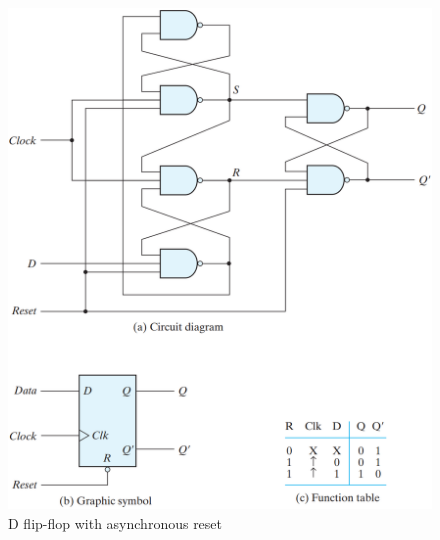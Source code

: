 \begin{figure}[H]
  \centering
  \includegraphics[width=\linewidth]{img/fig-5.14.png}
  \caption{D flip-flop with asynchronous reset}
  \label{fig:5.14}
\end{figure}